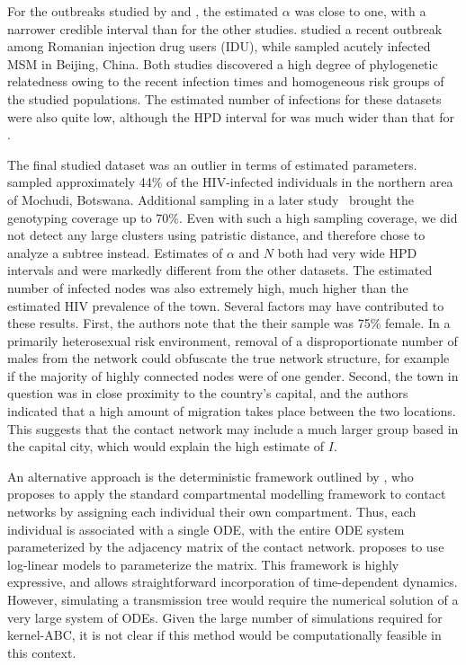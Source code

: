 For the outbreaks studied by \textcite{niculescu2015recent} and
\textcite{wang2015targeting}, the estimated $\alpha$ was close to one, with a
narrower credible interval than for the other studies.
\citeauthor{niculescu2015recent} studied a recent outbreak among Romanian
injection drug users (IDU), while \citeauthor{wang2015targeting} sampled
acutely infected MSM in Beijing, China. Both studies discovered a high degree
of phylogenetic relatedness owing to the recent infection times and homogeneous
risk groups of the studied populations. The estimated number of infections for
these datasets were also quite low, although the HPD interval for
\citeauthor{wang2015targeting} was much wider than that for
\citeauthor{niculescu2015recent}.

The final studied dataset was an outlier in terms of estimated parameters.
\textcite{novitsky2013phylogenetic} sampled approximately 44\% of the
HIV-infected individuals in the northern area of Mochudi, Botswana. Additional
sampling in a later study~\autocite{novitsky2014impact} brought the genotyping
coverage up to 70\%. Even with such a high sampling coverage, we did not detect
any large clusters using patristic distance, and therefore chose to analyze a
subtree instead. Estimates of $\alpha$ and $N$ both had very wide HPD
intervals and were markedly different from the other datasets. The estimated
number of infected nodes was also extremely high, much higher than the
estimated HIV prevalence of the town. Several factors may have contributed to
these results. First, the authors note that the their sample was 75\% female.
In a primarily heterosexual risk environment, removal of a disproportionate
number of males from the network could obfuscate the true network structure,
for example if the majority of highly connected nodes were of one gender.
Second, the town in question was in close proximity to the country's capital,
and the authors indicated that a high amount of migration takes place between
the two locations. This suggests that the contact network may include a much
larger group based in the capital city, which would explain the high estimate
of $I$.


An alternative approach is the deterministic framework outlined by
\textcite{morris1993epidemiology}, who proposes to apply the standard
compartmental modelling framework to contact networks by assigning each
individual their own compartment. Thus, each individual is associated with a
single \gls{ODE}, with the entire \gls{ODE} system parameterized by the
adjacency matrix of the contact network. \citeauthor{morris1993epidemiology}
proposes to use log-linear models to parameterize the matrix. This framework is
highly expressive, and allows straightforward incorporation of time-dependent
dynamics. However, simulating a transmission tree would require the numerical
solution of a very large system of \glspl{ODE}. Given the large number of
simulations required for kernel-\gls{ABC}, it is not clear if this method would
be computationally feasible in this context.

